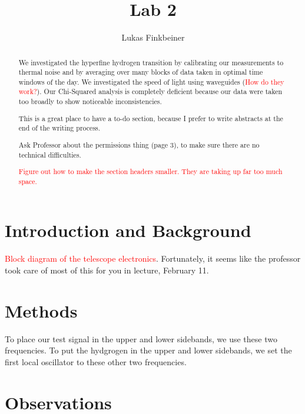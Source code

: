 \documentclass[12pt]{article}
\title{Lab 2}
\author{Lukas Finkbeiner}
\begin{document}
\maketitle

\begin{abstract}

We investigated the hyperfine hydrogen transition by calibrating our measurements to thermal noise and by averaging over many blocks of data taken in optimal time windows of the day. We investigated the speed of light using waveguides (\textcolor{red}{How do they work?}). Our Chi-Squared analysis is completely deficient because our data were taken too broadly to show noticeable inconsistencies.

This is a great place to have a to-do section, because I prefer to write abstracts at the end of the writing process.

\quad * Ask Professor about the permissions thing (page 3), to make sure there are no technical difficulties.

\textcolor{red}{Figure out how to make the section headers smaller. They are taking up far too much space.}

\end{abstract}


\section{Introduction and Background}

\textcolor{red}{Block diagram of the telescope electronics}. Fortunately, it seems like the professor took care of most of this for you in lecture, February 11.



\section{Methods}

To place our test signal in the upper and lower sidebands, we use these two frequencies. To put the hydgrogen in the upper and lower sidebands, we set the first local oscillator to these other two frequencies.

\section{Observations}
\end{document}
